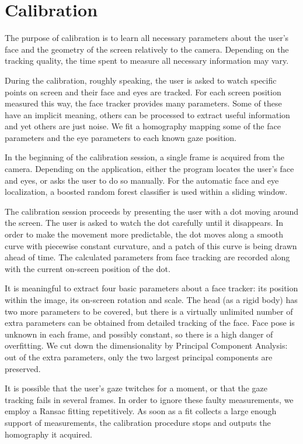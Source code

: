 
\section{Calibration}

The purpose of calibration is to learn all necessary parameters about the user's face and the geometry of the screen relatively to the camera.
Depending on the tracking quality, the time spent to measure all necessary information may vary.

During the calibration, roughly speaking, the user is asked to watch specific points on screen and their face and eyes are tracked.
For each screen position measured this way, the face tracker provides many parameters.
Some of these have an implicit meaning, others can be processed to extract useful information and yet others are just noise.
We fit a homography mapping some of the face parameters and the eye parameters to each known gaze position.

In the beginning of the calibration session, a single frame is acquired from the camera.
Depending on the application, either the program locates the user's face and eyes, or asks the user to do so manually.
For the automatic face and eye localization, a boosted random forest classifier is used within a sliding window.

The calibration session proceeds by presenting the user with a dot moving around the screen.
The user is asked to watch the dot carefully until it disappears.
In order to make the movement more predictable, the dot moves along a smooth curve with piecewise constant curvature, and a patch of this curve is being drawn ahead of time.
The calculated parameters from face tracking are recorded along with the current on-screen position of the dot.

It is meaningful to extract four basic parameters about a face tracker: its position within the image, its on-screen rotation and scale.
The head (as a rigid body) has two more parameters to be covered, but there is a virtually unlimited number of extra parameters can be obtained from detailed tracking of the face.
Face pose is unknown in each frame, and possibly constant, so there is a high danger of overfitting.
We cut down the dimensionality by Principal Component Analysis: out of the extra parameters, only the two largest principal components are preserved.

It is possible that the user's gaze twitches for a moment, or that the gaze tracking fails in several frames.
In order to ignore these faulty measurements, we employ a Ransac fitting repetitively.
As soon as a fit collects a large enough support of measurements, the calibration procedure stops and outputs the homography it acquired.

